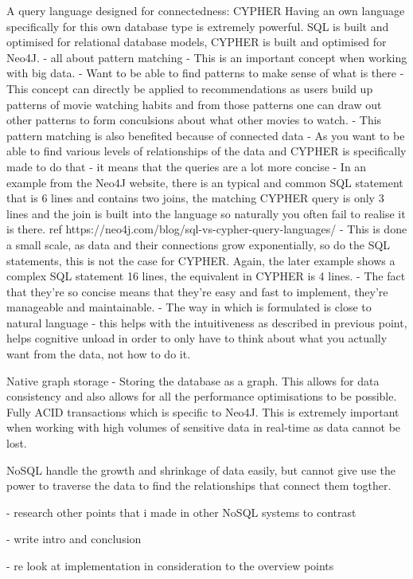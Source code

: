 \documentclass[a4paper]{article}
\begin{document}
A query language designed for connectedness: CYPHER
Having an own language specifically for this own database type is extremely powerful. SQL is built and optimised for relational database models, CYPHER is built and optimised for Neo4J.
- all about pattern matching
    - This is an important concept when working with big data.
    - Want to be able to find patterns to make sense of what is there
    - This concept can directly be applied to recommendations as users build up patterns of movie watching habits and from those patterns one can draw out other patterns to form conculsions about what other movies to watch.
- This pattern matching is also benefited because of connected data
    - As you want to be able to find various levels of relationships of the data and CYPHER is specifically made to do that
    - it means that the queries are a lot more concise
    - In an example from the Neo4J website, there is an typical and common SQL statement that is 6 lines and contains two joins, the matching CYPHER query is only 3 lines and the join is built into the language so naturally you often fail to realise it is there. ref https://neo4j.com/blog/sql-vs-cypher-query-languages/
        - This is done a small scale, as data and their connections grow exponentially, so do the SQL statements, this is not the case for CYPHER. Again, the later example shows a complex SQL statement 16 lines, the equivalent in CYPHER is 4 lines.
        - The fact that they're so concise means that they're easy and fast to implement, they're manageable and maintainable.
- The way in which is formulated is close to natural language
    - this helps with the intuitiveness as described in previous point, helps cognitive unload in order to only have to think about what you actually want from the data, not how to do it.

Native graph storage
- Storing the database as a graph. This allows for data consistency and also allows for all the performance optimisations to be possible.
Fully ACID transactions which is specific to Neo4J. This is extremely important when working with high volumes of sensitive data in real-time as data cannot be lost.

NoSQL handle the growth and shrinkage of data easily, but cannot give use the power to traverse the data to find the relationships that connect them togther.

\par
- research other points that i made in other NoSQL systems to contrast\par
- write intro and conclusion \par
- re look at implementation in consideration to the overview points \par
\end{document}
